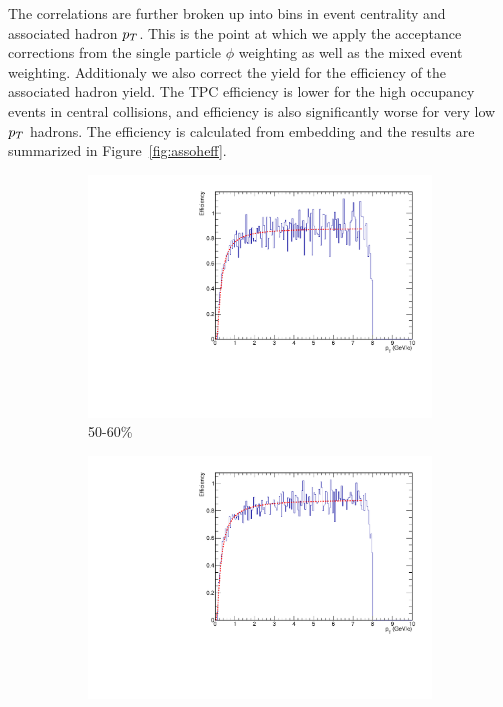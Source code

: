The correlations are further broken up into bins in event centrality and associated hadron $p_{T}$. This is the point at which we apply the acceptance corrections from the single particle $\phi$ weighting as well as the mixed event weighting. Additionaly we also correct the yield for the efficiency of the associated hadron yield. The TPC efficiency is lower for the high occupancy events in central collisions, and efficiency is also significantly worse for very low $p_{T}$ hadrons. The efficiency is calculated from embedding and the results are summarized in Figure~\ref{fig:assoheff}.

\begin{figure}[htbp]
	\begin{subfigure}{0.5\textwidth}
		\includegraphics[width=.9\textwidth]{Plots/Correlations/hadron_efficiency/hadron_efficiency_centbin_2.pdf}
		\caption{50-60\%}
		\label{fig:assoheffa}
	\end{subfigure}	
	\begin{subfigure}{0.5\textwidth}
		\includegraphics[width=.9\textwidth]{Plots/Correlations/hadron_efficiency/hadron_efficiency_centbin_3.pdf}

\end{subfigure}
\end{figure}
